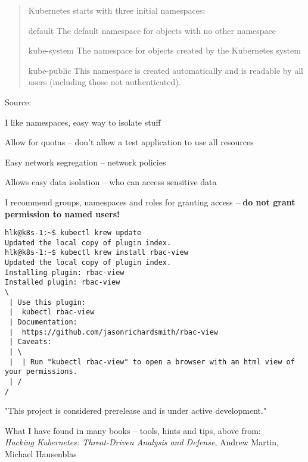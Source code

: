 \documentclass[Screen16to9,17pt]{foils}
\begin{document}

\begin{quote}
Kubernetes starts with three initial namespaces:
\begin{list2}
\item default The default namespace for objects with no other namespace
\item kube-system The namespace for objects created by the Kubernetes system
\item kube-public This namespace is created automatically and is readable by all users (including those not authenticated).
\end{list2}
\end{quote}
Source: 

\begin{list2}
\item I like namespaces, easy way to isolate stuff
\item Allow for quotas -- don't allow a test application to use all resources
\item Easy network segregation -- network policies
\item Allows easy data isolation -- who can access sensitive data
\item I recommend groups, namespaces and roles for granting access -- {\bf do not grant permission to named users!}
\end{list2}




\begin{verbatim}
hlk@k8s-1:~$ kubectl krew update
Updated the local copy of plugin index.
hlk@k8s-1:~$ kubectl krew install rbac-view
Updated the local copy of plugin index.
Installing plugin: rbac-view
Installed plugin: rbac-view
\
 | Use this plugin:
 | 	kubectl rbac-view
 | Documentation:
 | 	https://github.com/jasonrichardsmith/rbac-view
 | Caveats:
 | \
 |  | Run "kubectl rbac-view" to open a browser with an html view of your permissions.
 | /
/
\end{verbatim}

\begin{list2}
\item "This project is considered prerelease and is under active development."
\item What I have found in many books -- tools, hints and tips, above from:\\
\emph{Hacking Kubernetes: Threat-Driven Analysis and Defense}, Andrew Martin, Michael Hausenblas
\end{list2}
\end{document}
